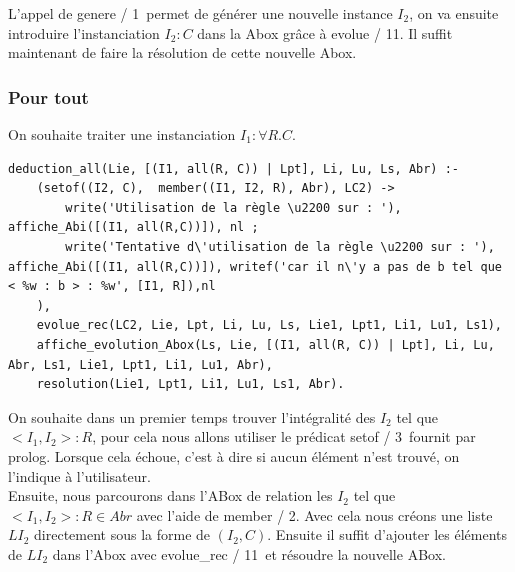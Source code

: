 \documentclass{article}
\begin{document}
L'appel de \color{blue}genere / 1\color{black}\ permet de générer une nouvelle instance $I_2$, on va ensuite introduire l'instanciation $I_2:C$ dans la Abox grâce à \color{blue}evolue / 11\color{black}. Il suffit maintenant de faire la résolution de cette nouvelle Abox.

\subsubsection{Pour tout}

On souhaite traiter une instanciation $I_1:\forall R.C$.
\begin{verbatim}
deduction_all(Lie, [(I1, all(R, C)) | Lpt], Li, Lu, Ls, Abr) :-
	(setof((I2, C),  member((I1, I2, R), Abr), LC2) -> 
		write('Utilisation de la règle \u2200 sur : '), affiche_Abi([(I1, all(R,C))]), nl ;
		write('Tentative d\'utilisation de la règle \u2200 sur : '), affiche_Abi([(I1, all(R,C))]), writef('car il n\'y a pas de b tel que < %w : b > : %w', [I1, R]),nl
	),
	evolue_rec(LC2, Lie, Lpt, Li, Lu, Ls, Lie1, Lpt1, Li1, Lu1, Ls1),
	affiche_evolution_Abox(Ls, Lie, [(I1, all(R, C)) | Lpt], Li, Lu, Abr, Ls1, Lie1, Lpt1, Li1, Lu1, Abr), 
	resolution(Lie1, Lpt1, Li1, Lu1, Ls1, Abr).
\end{verbatim}

On souhaite dans un premier temps trouver l'intégralité des $I_2$ tel que $<I_1,I_2>:R$, pour cela nous allons utiliser le prédicat \color{blue}setof / 3\color{black}\ fournit par prolog. Lorsque cela échoue, c'est à dire si aucun élément n'est trouvé, on l'indique à l'utilisateur.\\
Ensuite, nous parcourons dans l'ABox de relation les $I_2$ tel que $<I_1,I_2>:R\in Abr$ avec l'aide de \color{blue}member / 2\color{black}. Avec cela nous créons une liste $LI_2$ directement sous la forme de $(I_2,C)$. Ensuite il suffit d'ajouter les éléments de $LI_2$ dans l'Abox avec \color{blue}evolue\_rec / 11\color{black}\ et résoudre la nouvelle ABox.\\
\end{document}

